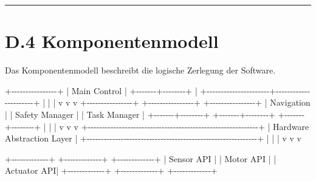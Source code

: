 \documentclass[
]{article}
\newenvironment{Shaded}{}{}
\newcommand{\NormalTok}[1]{#1}
\begin{document}
\begin{center}\rule{0.5\linewidth}{0.5pt}\end{center}

\section{D.4 Komponentenmodell}\label{d.4-komponentenmodell}

Das Komponentenmodell beschreibt die logische Zerlegung der Software.

\begin{Shaded}
\begin{Highlighting}[]
\NormalTok{                         +{-}{-}{-}{-}{-}{-}{-}{-}{-}{-}{-}{-}{-}{-}{-}{-}+}
\NormalTok{                         |  Main Control  |}
\NormalTok{                         +{-}{-}{-}{-}{-}{-}{-}+{-}{-}{-}{-}{-}{-}{-}{-}+}
\NormalTok{                                 |}
\NormalTok{          +{-}{-}{-}{-}{-}{-}{-}{-}{-}{-}{-}{-}{-}{-}{-}{-}{-}{-}{-}{-}{-}{-}+{-}{-}{-}{-}{-}{-}{-}{-}{-}{-}{-}{-}{-}{-}{-}{-}{-}{-}{-}{-}{-}{-}+}
\NormalTok{          |                      |                      |}
\NormalTok{          v                      v                      v}
\NormalTok{+{-}{-}{-}{-}{-}{-}{-}{-}{-}{-}{-}{-}{-}{-}{-}{-}+    +{-}{-}{-}{-}{-}{-}{-}{-}{-}{-}{-}{-}{-}{-}{-}{-}+    +{-}{-}{-}{-}{-}{-}{-}{-}{-}{-}{-}{-}{-}{-}{-}{-}+}
\NormalTok{| Navigation     |    | Safety Manager |    | Task Manager   |}
\NormalTok{+{-}{-}{-}{-}{-}{-}{-}+{-}{-}{-}{-}{-}{-}{-}{-}+    +{-}{-}{-}{-}{-}{-}{-}+{-}{-}{-}{-}{-}{-}{-}{-}+    +{-}{-}{-}{-}{-}{-}{-}+{-}{-}{-}{-}{-}{-}{-}{-}+}
\NormalTok{        |                     |                     |}
\NormalTok{        v                     v                     v}
\NormalTok{+{-}{-}{-}{-}{-}{-}{-}{-}{-}{-}{-}{-}{-}{-}{-}{-}{-}{-}{-}{-}{-}{-}{-}{-}{-}{-}{-}{-}{-}{-}{-}{-}{-}{-}{-}{-}{-}{-}{-}{-}{-}{-}{-}{-}{-}{-}{-}{-}{-}{-}{-}{-}{-}{-}{-}{-}{-}{-}{-}{-}+}
\NormalTok{|              Hardware Abstraction Layer                    |}
\NormalTok{+{-}{-}{-}{-}{-}{-}{-}{-}{-}{-}{-}{-}{-}{-}{-}{-}{-}{-}{-}{-}{-}{-}{-}{-}{-}{-}{-}{-}{-}{-}{-}{-}{-}{-}{-}{-}{-}{-}{-}{-}{-}{-}{-}{-}{-}{-}{-}{-}{-}{-}{-}{-}{-}{-}{-}{-}{-}{-}{-}{-}+}
\NormalTok{        |                     |                     |}
\NormalTok{        v                     v                     v}

\NormalTok{+{-}{-}{-}{-}{-}{-}{-}{-}{-}{-}{-}{-}{-}+       +{-}{-}{-}{-}{-}{-}{-}{-}{-}{-}{-}{-}{-}+       +{-}{-}{-}{-}{-}{-}{-}{-}{-}{-}{-}{-}{-}+}
\NormalTok{| Sensor API  |       | Motor API   |       | Actuator API|}
\NormalTok{+{-}{-}{-}{-}{-}{-}{-}{-}{-}{-}{-}{-}{-}+       +{-}{-}{-}{-}{-}{-}{-}{-}{-}{-}{-}{-}{-}+       +{-}{-}{-}{-}{-}{-}{-}{-}{-}{-}{-}{-}{-}+}


\end{Highlighting}
\end{Shaded}
\end{document}
